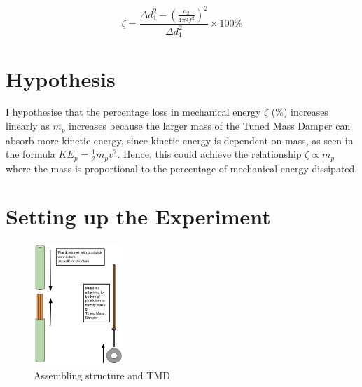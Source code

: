 \documentclass{article}
\begin{document}
\begin{equation}
    \label{eqn:zeta}
    \zeta=\frac{\Delta d_1^2-(\frac{a_2}{4\pi^2f^2})^2}{\Delta d_1^2} \times 100\%
\end{equation}

\section{Hypothesis}
I hypothesise that the percentage loss in mechanical energy $\zeta$ (\%) increases linearly as $m_p$ increases because the larger mass of the Tuned Mass Damper can absorb more kinetic energy, since kinetic energy is dependent on mass, as seen in the formula $KE_p=\frac{1}{2}m_pv^2$. Hence, this could achieve the relationship $\zeta \propto m_p$ where the mass is proportional to the percentage of mechanical energy dissipated.

\section{Setting up the Experiment}

\begin{figure}
\centering
\includegraphics[width=0.3\textwidth]{img/fig3.jpg}
\caption{\label{fig:3}Assembling structure and TMD}
\vspace{-50pt}
\end{figure}
\end{document}
